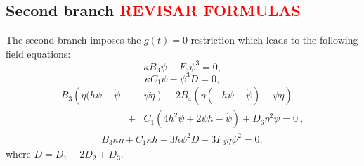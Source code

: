 \subsection{Second branch \textcolor{red}{REVISAR FORMULAS}}

The second branch imposes the $g(t) = 0$ restriction which leads to the following field equations:
\begin{dmath}
    \label{Feq_B2_1}
    \kappa B_3 \psi - F_3\psi^3= 0,
\end{dmath}
\begin{dmath}
    \label{Feq_B2_3}
    \kappa C_1\psi - \psi^3 D = 0 ,
\end{dmath}
\begin{eqnarray}
    \label{Feq_B2_4}
    B_3\left(\eta(h\psi -\dot{\psi}\right. &-&\left. \psi\dot{\eta}\right) - 2B_4\left(\eta\left(-h\psi - \dot{\psi}\right) - \psi\dot{\eta}\right)   \\ &+& C_1\left(4h^2\psi + 2\psi\dot{h} -\ddot{\psi}\right) + D_6\eta^2\psi = 0 \ ,\nonumber 
\end{eqnarray}
\begin{eqnarray}
    \label{Feq_B2_5}
    B_3\kappa\eta + C_1\kappa h - 3h\psi^2 D - 3F_3\eta\psi^2 = 0,
\end{eqnarray}
where $D = D_1 - 2D_2 + D_3$.

